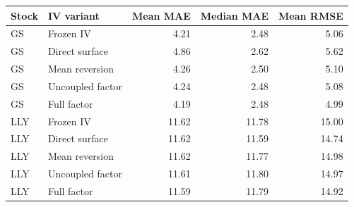 \begin{tabular}{llrrr}
\toprule
Stock & IV variant & Mean MAE & Median MAE & Mean RMSE \\
\midrule
GS & Frozen IV & 4.21 & 2.48 & 5.06 \\
GS & Direct surface & 4.86 & 2.62 & 5.62 \\
GS & Mean reversion & 4.26 & 2.50 & 5.10 \\
GS & Uncoupled factor & 4.24 & 2.48 & 5.08 \\
GS & Full factor & 4.19 & 2.48 & 4.99 \\
LLY & Frozen IV & 11.62 & 11.78 & 15.00 \\
LLY & Direct surface & 11.62 & 11.59 & 14.74 \\
LLY & Mean reversion & 11.62 & 11.77 & 14.98 \\
LLY & Uncoupled factor & 11.61 & 11.80 & 14.97 \\
LLY & Full factor & 11.59 & 11.79 & 14.92 \\
\bottomrule
\end{tabular}
